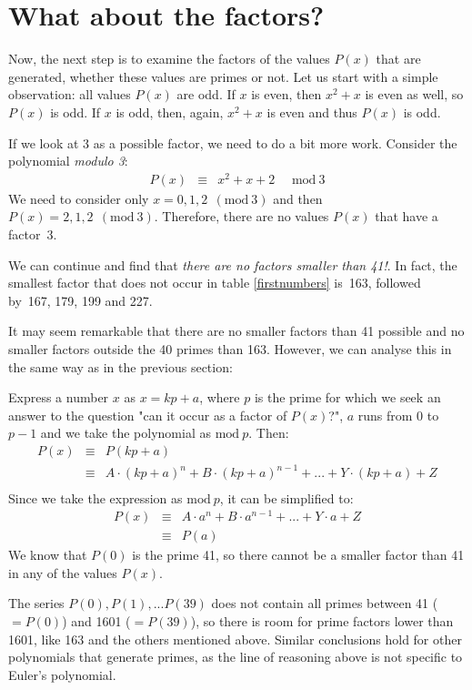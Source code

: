 \documentclass[onecolumn]{article}
\begin{document}
\section*{What about the factors?}
Now, the next step is to examine the factors of the values $P(x)$ that are generated, whether these values are primes or not. Let us start with a simple
observation: all values $P(x)$ are odd. If $x$ is even, then $x^2 + x$ is even as well, so $P(x)$ is odd. If $x$ is odd, then, again, $x^2 + x$ is even and
thus $P(x)$ is odd.

If we look at 3 as a possible factor, we need to do a bit more work. Consider the polynomial \emph{modulo 3}:
\begin{eqnarray}
     P(x) &\equiv& x^2 + x + 2 ~~~~~~\textrm{mod}~3
\end{eqnarray}
We need to consider only $x = 0, 1, 2 ~~(\textrm{mod}~3)$ and then $P(x) = 2, 1, 2 ~~(\textrm{mod}~3)$. Therefore, there are no values $P(x)$ that have a factor~3.

We can continue and find that \emph{there are no factors smaller than 41!}. In fact, the smallest factor that does not occur in table \ref{firstnumbers}
is~163, followed by~167, 179, 199 and 227.

It may seem remarkable that there are no smaller factors than 41 possible and no smaller factors outside the 40 primes than 163. However,
we can analyse this in the same way as in the previous section:

Express a number $x$ as $x = kp + a$, where $p$ is the prime for which we seek an answer to the question "can it occur as a factor of $P(x)$?",
$a$ runs from 0 to $p-1$ and we take the polynomial as $\textrm{mod}~p$. Then:
\begin{eqnarray}
\nonumber    P(x) &\equiv& P(k p + a) \\
                  &\equiv& A \cdot (k p + a)^n + B \cdot (k p + a)^{n-1} + ... + Y \cdot (k p + a) + Z \\
\end{eqnarray}
Since we take the expression as $\textrm{mod}~p$, it can be simplified to:
\begin{eqnarray}
\nonumber    P(x) &\equiv& A \cdot a^n + B \cdot a^{n-1} + ... + Y \cdot a + Z \\
                  &\equiv& P(a)
\end{eqnarray}
We know that $P(0)$ is the prime 41, so there cannot be a smaller factor than 41 in any of the values $P(x)$.

The series $P(0), P(1), ... P(39)$ does not contain all primes between 41 ($= P(0)$) and 1601 ($= P(39)$), so there is room for prime factors
lower than 1601, like 163 and the others mentioned above. Similar conclusions hold for other polynomials that generate primes, as the line
of reasoning above is not specific to Euler's polynomial.
\end{document}
